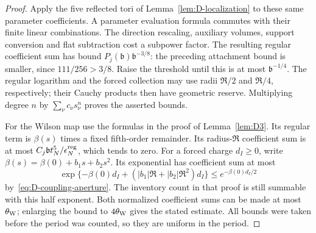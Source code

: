 \begin{proof}
Apply the five reflected tori of Lemma~\ref{lem:D-localization} to these same parameter coefficients. A parameter evaluation formula commutes with their finite linear combinations. The direction rescaling, auxiliary volumes, support conversion and flat subtraction cost a subpower factor. The resulting regular coefficient sum has bound $P_j(\mathfrak b)\mathfrak b^{-3/8}$: the preceding attachment bound is smaller, since $111/256>3/8$. Raise the threshold until this is at most $\mathfrak b^{-1/4}$. The regular logarithm and the forced collection may use radii $\mathfrak R/2$ and $\mathfrak R/4$, respectively; their Cauchy products then have geometric reserve. Multiplying degree $n$ by $\sum_\nu c_\nu s_\nu^n$ proves the asserted bounds.

For the Wilson map use the formulas in the proof of Lemma~\ref{lem:D3}. Its regular term is $\beta(s)$ times a fixed fifth-order remainder. Its radius-$\mathfrak R$ coefficient sum is at most $C_j\mathfrak b t_N^5/\epsilon_N^{\rm reg}$, which tends to zero. For a forced charge $d_I\ge0$, write $\beta(s)=\beta(0)+b_1s+b_2s^2$. Its exponential has coefficient sum at most
\begin{equation*}
\exp\{-\beta(0)d_I+(|b_1|\mathfrak R+|b_2|\mathfrak R^2)d_I\}
\le e^{-\beta(0)d_I/2}
\end{equation*}
by~\eqref{eq:D-coupling-aperture}. The inventory count in that proof is still summable with this half exponent. Both normalized coefficient sums can be made at most $\theta_{\rm W}$; enlarging the bound to $4\theta_{\rm W}$ gives the stated estimate. All bounds were taken before the period was counted, so they are uniform in the period.
\end{proof}

